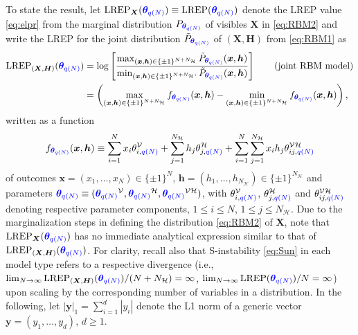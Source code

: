 \documentclass[numbib]{imamat}
\theoremstyle{theorem}
\theoremstyle{lemma}
\theoremstyle{example}
\theoremstyle{corollary}
\theoremstyle{definition}
\theoremstyle{remark}
\theoremstyle{approximation}
\theoremstyle{scheme}
\newcommand{\REP}{\mathrm{LREP}}
\newcommand{\thetaidx}{q(N)}
\newcommand{\thetaN}{\boldsymbol \theta_{\thetaidx}}
\newcommand{\ak}[1]{{\color{blue} #1}}
\begin{document}
To state the result, let \(\REP_{\boldsymbol X}(\ak{\thetaN}) \equiv \REP(\ak{\thetaN})\) denote the LREP value \eqref{eq:elpr} from the marginal distribution \(P_{\ak{\thetaN}}\) of visibles \(\boldsymbol X\) in \eqref{eq:RBM2} and write the LREP for the joint distribution \(\tilde{P}_{\ak{\thetaN}}\) of \((\boldsymbol X, \boldsymbol H)\) from \eqref{eq:RBM1} as
\begin{align*}
\REP_{(\boldsymbol X, \boldsymbol H)}(\ak{\thetaN}) &=\log\left[  \frac{\max_{ (\boldsymbol x, \boldsymbol h) \in \{\pm 1\}^{N+N_{\mathcal{H}}}}
\tilde{P}_{\ak{\thetaN}} (\boldsymbol x, \boldsymbol h)}{\min_{ (\boldsymbol x, \boldsymbol h) \in \{\pm 1\}^{N+N_{\mathcal{H}}}`}
\tilde{P}_{\ak{\thetaN}} (\boldsymbol x, \boldsymbol h)} \right] \qquad \text{(joint RBM model)}    \\    
&= \left(\max_{ (\boldsymbol x, \boldsymbol h) \in \{\pm 1\}^{N+N_{\mathcal{H}}}} f_{\ak{\thetaN}} (\boldsymbol x, \boldsymbol h)-\min_{ (\boldsymbol x, \boldsymbol h) \in \{\pm 1\}^{N+N_{\mathcal{H}}}} f_{\ak{\thetaN}} (\boldsymbol x, \boldsymbol h)\right),
\end{align*}
written as a function
\begin{equation}
\label{eq:f}
f_{\ak{\thetaN}} (\boldsymbol x, \boldsymbol h)  \equiv  \sum_{i=1}^N x_i  \theta_{i,\ak{\thetaidx}}^{\mathcal{V}} +  \sum_{j=1}^{N_\mathcal{H}} h_j \theta_{j,\ak{\thetaidx}}^{\mathcal{H}} + \sum_{i=1}^N \sum_{j=1}^{N_\mathcal{H}} x_i h_j  \theta_{ij,\ak{\thetaidx}}^{\mathcal{VH}}  
\end{equation}
of outcomes \(\boldsymbol x =(x_1,\ldots,x_N) \in\{\pm1\}^{N}\), \(\boldsymbol h =(h_1,\ldots,h_{N_{\mathcal{H}}}) \in\{\pm1\}^{N_{\mathcal{H}}}\) and parameters \(\ak{\thetaN} \equiv (\ak{\thetaN}^{\mathcal{V}}, \ak{\thetaN}^{\mathcal{H}}, \ak{\thetaN}^{\mathcal{VH}})\), with \(\theta_{i,\ak{\thetaidx}}^{\mathcal{V}}\), \(\theta_{j,\ak{\thetaidx}}^{\mathcal{H}}\) and \(\theta_{ij,\ak{\thetaidx}}^{\mathcal{VH}}\) denoting respective parameter components, \(1 \leq i \leq N\), \(1 \leq j \leq N_{\mathcal{H}}\). Due to the marginalization steps in defining the distribution \eqref{eq:RBM2} of \(\boldsymbol X\), note that \(\REP_{\boldsymbol X}(\ak{\thetaN})\) has no immediate analytical expression similar to that of \(\REP_{(\boldsymbol X, \boldsymbol H)}(\ak{\thetaN})\). For clarity, recall also that S-instability \eqref{eq:Sun} in each model type refers to a respective divergence (i.e., \(\lim_{N\to \infty} \REP_{(\boldsymbol X, \boldsymbol H)}(\ak{\thetaN}) /(N+N_{\mathcal{H}})=\infty\), \(\lim_{N\to \infty} \REP(\ak{\thetaN}) /N=\infty\)) upon scaling by the corresponding number of variables in a distribution. In the following, let \(|\boldsymbol y|_1 = \sum_{i=1}^d |y_i|\) denote the L1 norm of a generic vector \(\boldsymbol y =(y_1,\ldots,y_d)\), \(d \geq 1\).
\end{document}

